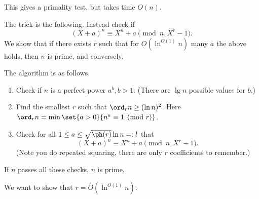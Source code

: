 This gives a primality test, but takes time $O(n)$.

The trick is the following. Instead check if
\[
(X+a)^n \equiv X^n+a \pmod{n,X^r-1}.
\]
We show that if there exists $r$ such that for $O(\ln^{O(1)} n)$ many $a$ the above holds, then $n$ is prime, and conversely.

The algorithm is as follows.
\begin{enumerate}
\item
Check if $n$ is a perfect power $a^b,b>1$. (There are $\lg n$ possible values for $b$.)
\item
Find the smallest $r$ such that $\ord_rn\ge (\ln n)^2$. Here $\ord_r n = \min \set{a>0}{n^a\equiv 1\pmod r}$.
\item
Check for all $1\le a\le \sqrt{\ph(r)}\ln n=:l$ that %
\[
(X+a)^n \equiv X^n+a \pmod{n,X^r-1}.
\] 
(Note you do repeated squaring, there are only $r$ coefficients to remember.)
\end{enumerate}
If $n$ passes all these checks, $n$ is prime.

We want to show that $r=O(\ln^{O(1)} n)$.

